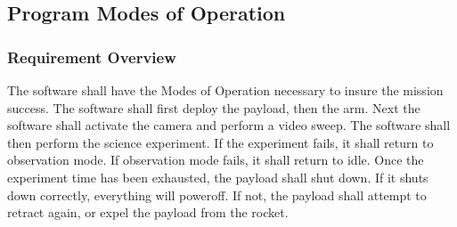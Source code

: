 \documentclass[letterpaper,10pt]{article}
\begin{document}
\subsection{Program Modes of Operation}
\subsubsection{Requirement Overview}
The software shall have the Modes of Operation necessary to insure the mission success.
The software shall first deploy the payload, then the arm. Next the software shall activate the 
camera and perform a video sweep. The software shall then perform the science experiment.
If the experiment fails, it shall return to observation mode.
If observation mode fails, it shall return to idle.
Once the experiment time has been exhausted, the payload shall shut down.
If it shuts down correctly, everything will poweroff. If not, the payload shall attempt to retract 
again, or expel the payload from the rocket.
\end{document}
